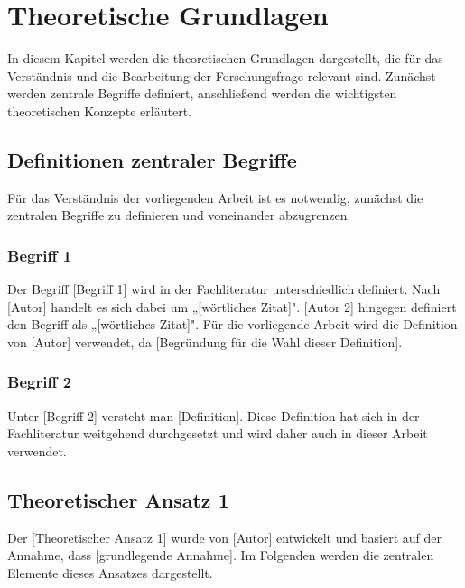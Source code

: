 \chapter{Theoretische Grundlagen}
\label{chap:theoretische_grundlagen}

In diesem Kapitel werden die theoretischen Grundlagen dargestellt, die für das Verständnis und die Bearbeitung der Forschungsfrage relevant sind. Zunächst werden zentrale Begriffe definiert, anschließend werden die wichtigsten theoretischen Konzepte erläutert.

\section{Definitionen zentraler Begriffe}
\label{sec:definitionen}

Für das Verständnis der vorliegenden Arbeit ist es notwendig, zunächst die zentralen Begriffe zu definieren und voneinander abzugrenzen.

\subsection{Begriff 1}
\label{subsec:begriff1}

Der Begriff [Begriff 1] wird in der Fachliteratur unterschiedlich definiert. Nach [Autor] handelt es sich dabei um „[wörtliches Zitat]". [Autor 2] hingegen definiert den Begriff als „[wörtliches Zitat]". Für die vorliegende Arbeit wird die Definition von [Autor] verwendet, da [Begründung für die Wahl dieser Definition].

\subsection{Begriff 2}
\label{subsec:begriff2}

Unter [Begriff 2] versteht man [Definition]. Diese Definition hat sich in der Fachliteratur weitgehend durchgesetzt und wird daher auch in dieser Arbeit verwendet.

\section{Theoretischer Ansatz 1}
\label{sec:theoretischer_ansatz1}

Der [Theoretischer Ansatz 1] wurde von [Autor] entwickelt und basiert auf der Annahme, dass [grundlegende Annahme]. Im Folgenden werden die zentralen Elemente dieses Ansatzes dargestellt.

